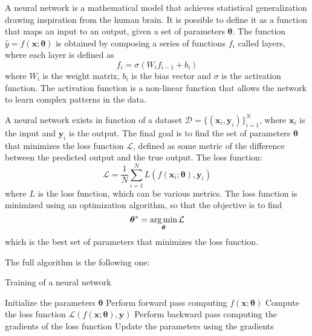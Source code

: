 A neural network is a mathematical model that achieves statistical generalization drawing inspiration from the human brain. It is possible to define it as a function that maps an input to an output, given a set of parameters \( \bm{\theta} \). The function \( \hat{y} = f(\bm{x}; \bm{\theta}) \) is obtained by composing a series of functions \( f_i \) called layers, where each layer is defined as
\begin{equation}
    f_i = \sigma(W_i f_{i-1} + b_i)
\end{equation}
where \( W_i \) is the weight matrix, \( b_i \) is the bias vector and \( \sigma \) is the activation function. The activation function is a non-linear function that allows the network to learn complex patterns in the data. 

A neural network exists in function of a dataset \( \mathcal{D} = \{(\bm{x}_i, \bm{y}_i)\}_{i=1}^N \), where \( \bm{x}_i \) is the input and \( \bm{y}_i \) is the output. The final goal is to find the set of parameters \( \bm{\theta} \) that minimizes the loss function \( \mathcal{L} \), defined as some metric of the difference between the predicted output and the true output. The loss function:
\begin{equation}
    \mathcal{L} = \frac{1}{N} \sum_{i=1}^N L(f(\bm{x}_i; \bm{\theta}), \bm{y}_i)
\end{equation}
where \( L \) is the loss function, which can be various metrics. The loss function is minimized using an optimization algorithm, so that the objective is to find
\begin{equation}
    \bm{\theta}^* = \operatorname*{arg\,min}_{\bm{\theta}} \mathcal{L}
\end{equation}
which is the best set of parameters that minimizes the loss function.

The full algorithm is the following one:
\begin{algorithm} 
    \caption{Training of a neural network}
    \begin{algorithmic}
        \State Initialize the parameters \( \bm{\theta} \)
                \State Perform forward pass computing \( f(\bm{x}; \bm{\theta}) \)
                \State Compute the loss function \( \mathcal{L}(f(\bm{x}; \bm{\theta}), \bm{y}) \)
                \State Perform backward pass computing the gradients of the loss function
                \State Update the parameters using the gradients
            \EndFor
        \EndWhile
    \end{algorithmic}
\end{algorithm}

